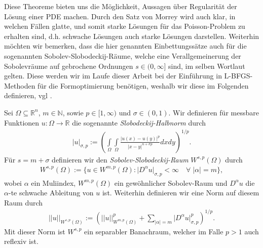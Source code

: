 Diese Theoreme bieten uns die Möglichkeit, Aussagen über Regularität der Lösung einer PDE machen. Durch den Satz von Morrey wird auch klar, in welchen Fällen glatte, und somit starke Lösungen für das Poisson-Problem zu erhalten sind, d.h. schwache Lösungen auch starke Lösungen darstellen. Weiterhin möchten wir bemerken, dass die hier genannten Einbettungssätze auch für die sogenannten Sobolev-Slobodeckij-Räume, welche eine Verallgemeinerung der Sobolevräume auf gebrochene Ordnungen $s \in (0,\infty]$ sind, im selben Wortlaut gelten. Diese werden wir im Laufe dieser Arbeit bei der Einführung in L-BFGS-Methoden für die Formoptimierung benötigen, weshalb wir diese im Folgenden definieren, vgl \cite{brokenSobolev}.

\begin{defi}
Sei $\Omega \subseteq \mathbb{R}^n$, $m\in\mathbb{N}$, sowie \newline $p\in [1, \infty)$ und $\sigma\in (0,1)$. Wir definieren für messbare Funktionen $u: \Omega \rightarrow \mathbb{R}$ die sogenannte \textit{Slobodeckij-Halbnorm} durch
\begin{align*}
	\vert u \vert _{\sigma, p} := \left(\underset{\Omega}{\int}\underset{\Omega}{\int} 
	\frac{\vert u(x) - u(y)\vert^p}{\vert x-y \vert^{n + \sigma p}}dxdy\right)^{1/p}.
\end{align*}
Für $s = m + \sigma$ definieren wir den \textit{Sobolev-Slobodeckij-Raum} $W^{s,p}(\Omega)$ durch
\begin{align*}
	W^{s,p}(\Omega) := \{ u\in W^{m,p}(\Omega) : \vert D^\alpha u \vert _{\sigma, p} < \infty 				\quad \forall \;\vert\alpha\vert = m\},
\end{align*}
wobei $\alpha$ ein Muliindex, $W^{m,p}(\Omega)$ ein gewöhnlicher Sobolev-Raum und $D^\alpha u$ die $\alpha$-te schwache Ableitung von $u$ ist.
Weiterhin definieren wir eine Norm auf diesem Raum durch
\begin{align*}
	\vert\vert u \vert\vert_{W^{s,p}(\Omega)} := (\vert\vert u \vert\vert_{W^{m,p}(\Omega)}^p + \underset{ \vert \alpha \vert = m}{\sum}\vert D^\alpha u \vert _{\sigma, p}^p)^{1/p}.
\end{align*}
Mit dieser Norm ist $W^{s,p}$ ein separabler Banachraum, welcher im Falle $p > 1$ auch reflexiv ist.
\end{defi}


